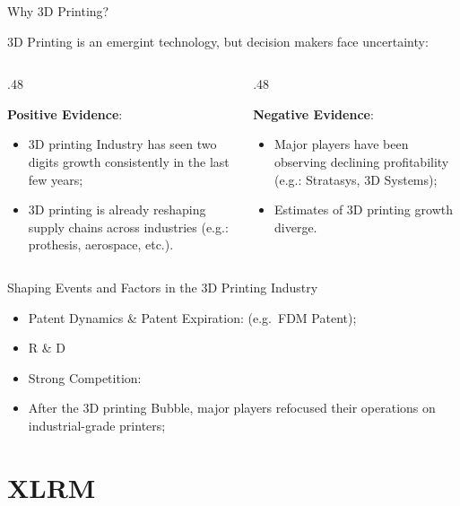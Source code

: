 \documentclass[12pt,ignorenonframetext,]{beamer}
\providecommand{\tightlist}{%
  \setlength{\itemsep}{0pt}\setlength{\parskip}{0pt}}
\def\begincols{\begin{columns}}
\def\begincol{\begin{column}}
\def\endcol{\end{column}}
\def\endcols{\end{columns}}
\begin{document}
\begin{frame}{Why 3D Printing?}

3D Printing is an emergint technology, but decision makers face
uncertainty:

\begincols
 \begincol{.48\textwidth}

\textbf{Positive Evidence}:

\begin{itemize}
\tightlist
\item
  3D printing Industry has seen two digits growth consistently in the
  last few years;
\item
  3D printing is already reshaping supply chains across industries
  (e.g.: prothesis, aerospace, etc.).
\end{itemize}

\endcol
\begincol{.48\textwidth}

\textbf{Negative Evidence}:

\begin{itemize}
\tightlist
\item
  Major players have been observing declining profitability (e.g.:
  Stratasys, 3D Systems);
\item
  Estimates of 3D printing growth diverge.
\end{itemize}

\endcol
\endcols

\end{frame}

\begin{frame}{Shaping Events and Factors in the 3D Printing Industry}

\begin{itemize}
\tightlist
\item
  Patent Dynamics \& Patent Expiration: (e.g.~FDM Patent);
\item
  R \& D
\item
  Strong Competition:
\item
  After the 3D printing Bubble, major players refocused their operations
  on industrial-grade printers;
\end{itemize}

\end{frame}

\section{XLRM}\label{xlrm}
\end{document}
